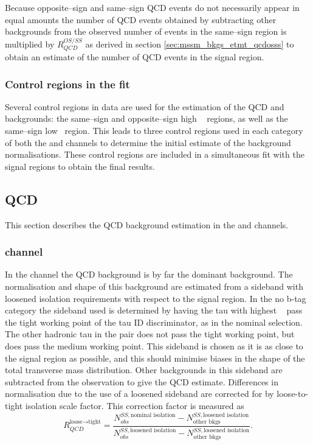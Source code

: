 Because opposite--sign and same--sign QCD events do not
necessarily appear in equal amounts the number of QCD
events obtained by subtracting other backgrounds from the
observed number of events in the same--sign region is multiplied
by $R_{QCD}^{OS/SS}$ as derived in section \ref{sec:mssm_bkgs_etmt_qcdosss} 
to obtain an estimate of the number of QCD events in the signal region.

\subsubsection{Control regions in the fit}
\label{sec:mssm_bkgs_etmt_ctrl}
Several control regions in data are used for the estimation
of the QCD and \Wjets backgrounds: the same--sign and 
opposite--sign high \mT~ regions, as well as the same--sign
low \mT~region. This leads to three control regions used 
in each category of both the \mutau and \etau channels to determine
the initial estimate of the background normalisations.
These control regions are included in a simultaneous fit
with the signal regions to obtain the final results.


\subsection{QCD}
\label{sec:mssm_bkgs_qcd}
This section describes the QCD background
estimation in the \tautau and \emu channels.

\subsubsection{\texorpdfstring{\tautau channel}{tau tau channel}}
\label{sec:mssm_bkgs_qcd_tt}
In the \tautau channel the QCD background is by far the 
dominant background. The normalisation and shape 
of this background are estimated from a sideband with loosened 
isolation requirements with respect to the signal region. 
In the no b-tag category the sideband used is determined
by having the tau with highest \pT~ pass the tight working
point of the tau ID discriminator, as in the nominal selection.
The other hadronic tau in the pair does not pass the tight working point,
but does pass the medium working point. This sideband is 
chosen as it is as close to the signal region as possible, and 
this should minimise biases in the shape of the total transverse mass
distribution. Other backgrounds
in this sideband are subtracted from the observation to give
the QCD estimate. Differences in normalisation due to
the use of a loosened sideband are corrected for by loose-to-tight isolation
scale factor. This correction factor is measured as
\begin{equation}\label{eqn:tautau_qcd}
R_{QCD}^{\text{loose}\rightarrow\text{tight}} = \frac{N_{obs}^{SS,\text{nominal isolation}}-N_{\text{other bkgs}}^{SS,\text{loosened isolation}}}{N_{obs}^{SS,\text{loosened isolation}}-N_{\text{other bkgs}}^{SS,\text{loosened isolation}}}.
\end{equation}

